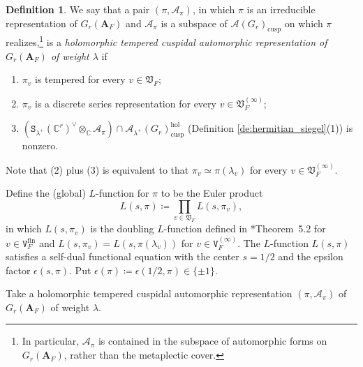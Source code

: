 \documentclass[12pt]{amsart}
\numberwithin{equation}{section}
\theoremstyle{plain}
\theoremstyle{definition}
\newtheorem{definition}[proposition]{Definition}
\theoremstyle{remark}
\renewcommand{\b}[1]{\mathbf{#1}}
\renewcommand{\c}[1]{\mathcal{#1}}
\renewcommand{\d}[1]{\mathbb{#1}}
\newcommand{\f}[1]{\mathfrak{#1}}
\renewcommand{\r}[1]{\mathrm{#1}}
\renewcommand{\(}{\left(}
\renewcommand{\)}{\right)}
\newcommand{\bA}{\b A}
\newcommand{\cA}{\c A}
\newcommand{\dC}{\d C}
\newcommand{\fV}{\f V}
\newcommand{\tS}{\mathtt{S}}
\newcommand{\tV}{\mathtt{V}}
\newcommand{\cusp}{\r{cusp}}
\newcommand{\fin}{\r{fin}}
\newcommand{\hol}{\r{hol}}
\begin{document}
\begin{definition}\label{de:hermitian_representation}
We say that a pair $(\pi,\cA_\pi)$, in which $\pi$ is an irreducible representation of $G_r(\bA_F)$ and $\cA_\pi$ is a subspace of $\cA(G_r)_\cusp$ on which $\pi$ realizes,\footnote{In particular, $\cA_\pi$ is contained in the subspace of automorphic forms on $G_r(\bA_F)$, rather than the metaplectic cover.} is a \emph{holomorphic tempered cuspidal automorphic representation of $G_r(\bA_F)$ of weight $\lambda$} if
\begin{enumerate}
  \item $\pi_v$ is tempered for every $v\in\fV_F$;

  \item $\pi_v$ is a discrete series representation for every $v\in\fV_F^{(\infty)}$;

  \item $\(\tS_{\lambda^+}(\dC^r)^\vee\otimes_\dC\cA_\pi\)\cap\cA_{\lambda^+}(G_r)_\cusp^\hol$ (Definition \ref{de:hermitian_siegel}(1)) is nonzero.
\end{enumerate}
Note that (2) plus (3) is equivalent to that $\pi_v\simeq\pi(\lambda_v)$ for every $v\in\fV_F^{(\infty)}$.

Define the (global) $L$-function for $\pi$ to be the Euler product
\[
L(s,\pi)\coloneqq\prod_{v\in\fV_F}L(s,\pi_v),
\]
in which $L(s,\pi_v)$ is the doubling $L$-function defined in \cite{Yam14}*{Theorem~5.2} for $v\in\tV_F^\fin$ and $L(s,\pi_v)=L(s,\pi(\lambda_v))$ for $v\in\tV_F^{(\infty)}$. The $L$-function $L(s,\pi)$ satisfies a self-dual functional equation with the center $s=1/2$ and the epsilon factor $\epsilon(s,\pi)$. Put $\epsilon(\pi)\coloneqq\epsilon(1/2,\pi)\in\{\pm 1\}$.
\end{definition}


Take a holomorphic tempered cuspidal automorphic representation $(\pi,\cA_\pi)$ of $G_r(\bA_F)$ of weight $\lambda$.
\end{document}
